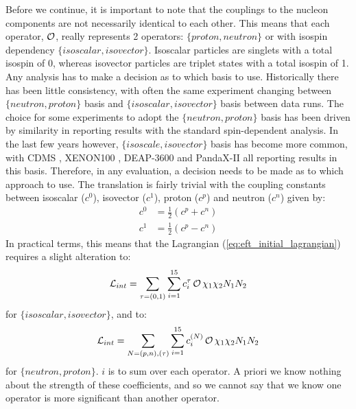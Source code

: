 \par
Before we continue, it is important to note that the couplings to the nucleon components are not necessarily identical to each other.
This means that each operator, $\operatorname{\mathcal{O}}$, really represents 2 operators: $\{proton,neutron\}$ or with isospin dependency $\{isoscalar,isovector\}$.
Isoscalar particles are singlets with a total isospin of 0, whereas isovector particles are triplet states with a total isospin of 1.
Any analysis has to make a decision as to which basis to use.
Historically there has been little consistency, with often the same experiment changing between $\{neutron, proton\}$ basis and $\{isoscalar, isovector\}$ basis between data runs.
The choice for some experiments to adopt the $\{neutron, proton\}$ basis has been driven by similarity in reporting results with the standard spin-dependent analysis.
In the last few years however, $\{isoscale, isovector\}$ basis has become more common, with CDMS \cite{cdms_eft_ref}, XENON100 \cite{xenon100_eft_ref}, DEAP-3600 \cite{deap3600_eft_ref} and PandaX-II \cite{pandax_2_eft_ref} all reporting results in this basis.
Therefore, in any evaluation, a decision needs to be made as to which approach to use.
The translation is fairly trivial with the coupling constants between isoscalar ($c^0$), isovector ($c^1$), proton ($c^p$) and neutron ($c^n$) given by:
\begin{equation}
\begin{split}
    c^0 &= \frac{1}{2}(c^p + c^n)  \\
    c^1 &= \frac{1}{2}(c^p - c^n) 
\end{split}
\label{eq:eft_iso_to_pn}
\end{equation}
In practical terms, this means that the Lagrangian (\autoref{eq:eft_initial_lagrangian}) requires a slight alteration to:
\begin{equation}
    \mathcal{L}_{int}  = \sum_{\tau = (0,1)} \sum^{15}_{i=1}c^{\tau}_{i} \operatorname{\mathcal{O}} \chi_1 \chi_2 N_1 N_2
\end{equation}
for $\{isoscalar,isovector\}$, and to:
\begin{equation}
    \mathcal{L}_{int} = \sum_{N = (p,n),(\tau)} \sum^{15}_{i=1}c^{(N)}_{i} \operatorname{\mathcal{O}} \chi_1 \chi_2 N_1 N_2
\end{equation}
for $\{neutron,proton\}$.
$i$ is to sum over each operator.
A priori we know nothing about the strength of these coefficients, and so we cannot say that we know one operator is more significant than another operator.

